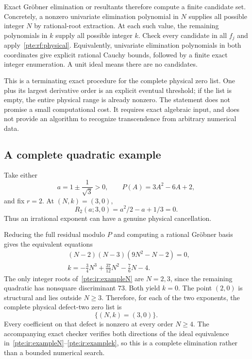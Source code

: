 \documentclass[11pt,a4paper]{article}
\numberwithin{equation}{section}
\theoremstyle{definition}
\theoremstyle{plain}
\begin{document}
Exact Gr\"obner elimination or resultants therefore compute a finite candidate set. Concretely, a nonzero univariate elimination polynomial in $N$ supplies all possible integer $N$ by rational-root extraction. At each such value, the remaining polynomials in $k$ supply all possible integer $k$. Check every candidate in all $f_j$ and apply~\eqref{pte:rf:physical}. Equivalently, univariate elimination polynomials in both coordinates give explicit rational Cauchy bounds, followed by a finite exact integer enumeration. A unit ideal means there are no candidates.

This is a terminating exact procedure for the complete physical zero list. One plus its largest derivative order is an explicit eventual threshold; if the list is empty, the entire physical range is already nonzero. The statement does not promise a small computational cost. It requires exact algebraic input, and does not provide an algorithm to recognize transcendence from arbitrary numerical data.

\subsection{A complete quadratic example}\label{pte:ir:example}
Take either
\[
 a=1\pm\frac1{\sqrt3}>0,\qquad P(A)=3A^2-6A+2,
\]
and fix $r=2$. At $(N,k)=(3,0)$,
\[
 R_2(a;3,0)=a^2/2-a+1/3=0.
\]
Thus an irrational exponent can have a genuine physical cancellation.

Reducing the full residual modulo $P$ and computing a rational Gr\"obner basis gives the equivalent equations
\begin{align}
 &(N-2)(N-3)(9N^2-N-2)=0,\label{pte:ir:exampleN}\\
 &k=-\frac34N^3+\frac{37}{12}N^2-\frac76N-4.\label{pte:ir:examplek}
\end{align}
The only integer roots of~\eqref{pte:ir:exampleN} are $N=2,3$, since the remaining quadratic has nonsquare discriminant $73$. Both yield $k=0$. The point $(2,0)$ is structural and lies outside $N\ge3$. Therefore, for each of the two exponents, the complete physical defect-two zero list is
\[
 \boxed{\{(N,k)=(3,0)\}.}
\]
Every coefficient on that defect is nonzero at every order $N\ge4$. The accompanying exact checker verifies both directions of the ideal equivalence in~\eqref{pte:ir:exampleN}--\eqref{pte:ir:examplek}, so this is a complete elimination rather than a bounded numerical search.
\end{document}
